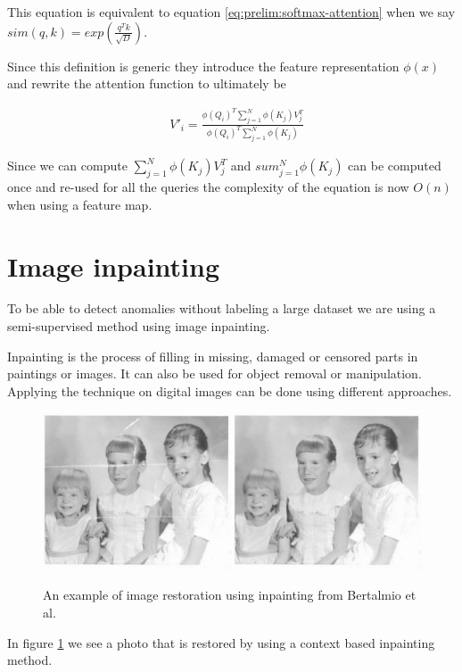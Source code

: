 This equation is equivalent to equation \ref{eq:prelim:softmax-attention} when we say $sim(q, k) = exp(\frac{q^Tk}{\sqrt{D}})$.

Since this definition is generic they introduce the feature representation $\phi(x)$ and rewrite the attention function to ultimately be

\begin{align}
    &V'_i = \frac{\phi(Q_i)^T\sum_{j=1}^{N} \phi(K_j)V_j^T}{\phi(Q_i)^T\sum_{j=1}^{N} \phi(K_j)}
\end{align}

Since we can compute $\sum_{j=1}^{N} \phi(K_j)V_j^T$ and $sum_{j=1}^{N} \phi(K_j)$ can be computed once and re-used for all the queries the complexity of the equation is now $O(n)$ when using a feature map.

\section{Image inpainting}
\label{sec:prelim:image-inpainting}

To be able to detect anomalies without labeling a large dataset we are using a semi-supervised method using image inpainting.

Inpainting is the process of filling in missing, damaged or censored parts in paintings or images. It can also be used for object removal or manipulation.
Applying the technique on digital images can be done using different approaches.

\begin{figure}[h!]
\caption{An example of image restoration using inpainting from Bertalmio et al. \cite{bertalmio_image_2000}}
\centering
\includegraphics[width=\textwidth]{imgs/inpainting-example.jpeg}
\label{fig:prelim:inpainting-example}
\end{figure}

In figure \ref{fig:prelim:inpainting-example} we see a photo that is restored by using a context based inpainting method.

